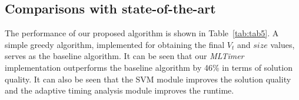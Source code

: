 

\subsection{Comparisons with state-of-the-art}

The performance of our proposed algorithm is shown in Table~\ref{tab:tab5}. A simple greedy algorithm, implemented for obtaining the final $V_t$ and $size$ values, serves as the baseline algorithm. It can be seen that our \textit{MLTimer} implementation outperforms the baseline algorithm by 46\% in terms of solution quality. It can also be seen that the SVM module improves the solution quality and the adaptive timing analysis module improves the runtime. 

